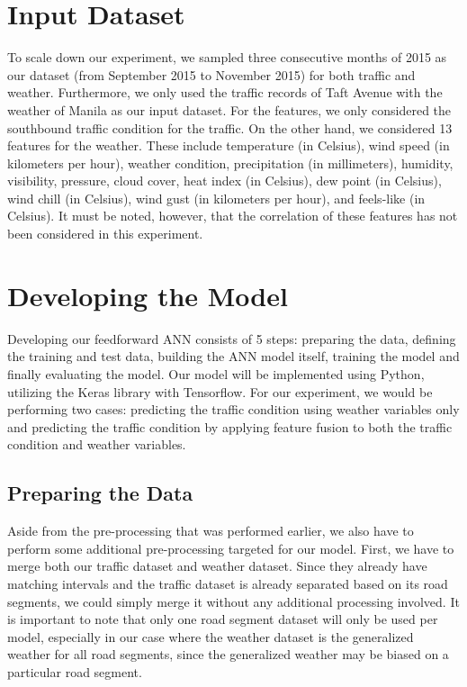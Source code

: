 \section{Input Dataset}
To scale down our experiment, we sampled three consecutive months of 2015 as our dataset (from September 2015 to November 2015) for both traffic and weather. Furthermore, we only used the traffic records of Taft Avenue with the weather of Manila as our input dataset. For the features, we only considered the southbound traffic condition for the traffic. On the other hand, we considered 13 features for the weather. These include temperature (in Celsius), wind speed (in kilometers per hour), weather condition, precipitation (in millimeters), humidity, visibility, pressure, cloud cover, heat index (in Celsius), dew point (in Celsius), wind chill (in Celsius), wind gust (in kilometers per hour), and feels-like (in Celsius). It must be noted, however, that the correlation of these features has not been considered in this experiment.


\section{Developing the Model}
Developing our feedforward ANN consists of 5 steps: preparing the data, defining the training and test data, building the ANN model itself, training the model and finally evaluating the model. Our model will be implemented using Python, utilizing the Keras library with Tensorflow. For our experiment, we would be performing two cases: predicting the traffic condition using weather variables only and predicting the traffic condition by applying feature fusion to both the traffic condition and weather variables.

\subsection{Preparing the Data}
Aside from the pre-processing that was performed earlier, we also have to perform some additional pre-processing targeted for our model. First, we have to merge both our traffic dataset and weather dataset. Since they already have matching intervals and the traffic dataset is already separated based on its road segments, we could simply merge it without any additional processing involved. It is important to note that only one road segment dataset will only be used per model, especially in our case where the weather dataset is the generalized weather for all road segments, since the generalized weather may be biased on a particular road segment.



